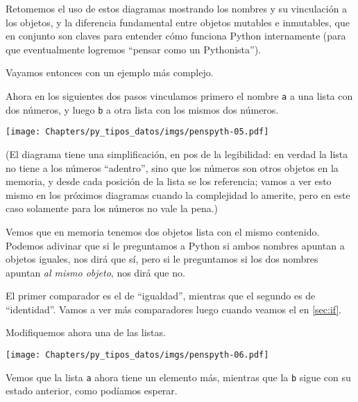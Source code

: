 Retomemos el uso de estos diagramas mostrando los nombres y su vinculación a los objetos, y la diferencia fundamental entre objetos mutables e inmutables, que en conjunto son claves para entender cómo funciona Python internamente (para que eventualmente logremos ``pensar como un Pythonista''). 

Vayamos entonces con un ejemplo más complejo. 

Ahora en los siguientes dos pasos vinculamos primero el nombre \verb|a| a una lista con dos números, y luego \verb|b| a otra lista con los mismos dos números.


\begin{center}
    \texttt{[image: Chapters/py\_tipos\_datos/imgs/penspyth-05.pdf]}
\end{center}

(El diagrama tiene una simplificación, en pos de la legibilidad: en verdad la lista no tiene a los números ``adentro'', sino que los números son otros objetos en la memoria, y desde cada posición de la lista se los referencia; vamos a ver esto mismo en los próximos diagramas cuando la complejidad lo amerite, pero en este caso solamente para los números no vale la pena.)

Vemos que en memoria tenemos dos objetos lista con el mismo contenido. Podemos adivinar que si le preguntamos a Python si ambos nombres apuntan a objetos iguales, nos dirá que sí, pero si le preguntamos si los dos nombres apuntan \textit{al mismo objeto}, nos dirá que no.


El primer comparador es el de ``igualdad'', mientras que el segundo es de ``identidad''. Vamos a ver más comparadores luego cuando veamos el  en \ref{sec:if}.

Modifiquemos ahora una de las listas.


\begin{center}
    \texttt{[image: Chapters/py\_tipos\_datos/imgs/penspyth-06.pdf]}
\end{center}

Vemos que la lista \verb|a| ahora tiene un elemento más, mientras que la \verb|b| sigue con su estado anterior, como podíamos esperar.

